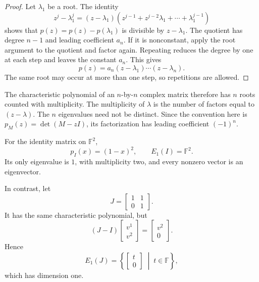\begin{pendingreview}
\begin{proof}
  Let \(\lambda_1\) be a root. The identity
  \[
    z^j-\lambda_1^j
      =(z-\lambda_1)
        (z^{j-1}+z^{j-2}\lambda_1+\cdots+\lambda_1^{j-1})
  \]
  shows that \(p(z)=p(z)-p(\lambda_1)\) is divisible by
  \(z-\lambda_1\). The quotient has degree \(n-1\) and leading
  coefficient \(a_n\). If it is nonconstant, apply the root argument
  to the quotient and factor again. Repeating reduces the degree by one
  at each step and leaves the constant \(a_n\). This gives
  \[
    p(z)=a_n(z-\lambda_1)\cdots(z-\lambda_n).
  \]
  The same root may occur at more than one step, so repetitions are allowed.
\end{proof}
\end{pendingreview}

The characteristic polynomial of an \(n\)-by-\(n\) complex matrix
therefore has \(n\) roots counted with multiplicity. The multiplicity
of \(\lambda\) is the number of factors equal to \((z-\lambda)\).
The \(n\) eigenvalues need not be distinct. Since the convention here is
\(p_M(z)=\det(M-zI)\), its factorization has leading coefficient
\((-1)^n\).

\begin{example}
  For the identity matrix on \(\mathbb F^2\),
  \[
    p_I(x)=(1-x)^2,\qquad E_1(I)=\mathbb F^2.
  \]
  Its only eigenvalue is \(1\), with multiplicity two, and every
  nonzero vector is an eigenvector.

  In contrast, let
  \[
    J=\begin{bmatrix}1&1\\0&1\end{bmatrix}.
  \]
  It has the same characteristic polynomial, but
  \[
    (J-I)\begin{bmatrix}v^1\\v^2\end{bmatrix}
      =\begin{bmatrix}v^2\\0\end{bmatrix}.
  \]
  Hence
  \[
    E_1(J)=\left\{\begin{bmatrix}t\\0\end{bmatrix}\;\middle|\;t\in\mathbb F\right\},
  \]
  which has dimension one.
\end{example}

